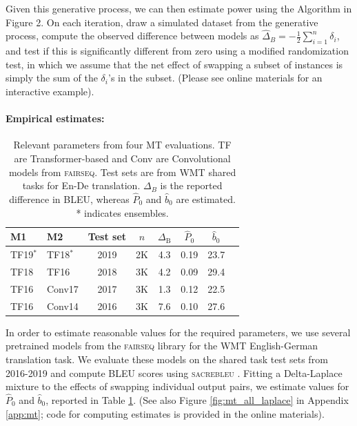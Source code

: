 \documentclass[11pt,a4paper]{article}
\begin{document}
Given this generative process, we can then estimate power using the Algorithm in Figure 2. On each iteration, draw a simulated dataset from the generative process, compute the observed difference between models as $\hat \Delta_B = -\frac{1}{2} \sum_{i=1}^n \delta_i$, and test if this is significantly different from zero using a modified randomization test, in which we assume that the net effect of swapping a subset of instances is simply the sum of the $\delta_i$'s in the subset. (Please see online materials for an interactive example). 

\paragraph{Empirical estimates:}

\begin{table}[]
    \centering
    \small
    \begin{tabular}{l l c c c c c c}
        \toprule
        \textbf{M1} & \textbf{M2} & \textbf{Test set} & $n$ & $\Delta_{\textrm{B}}$ & $\hat P_0$ & $\hat b_0$ \\
        \midrule
        TF19$^*$ & TF18$^*$ & 2019 & 2K & 4.3 & 0.19 & 23.7 \\
        TF18 & TF16 & 2018 & 3K & 4.2 & 0.09 & 29.4 \\
        TF16 & Conv17 & 2017 & 3K & 1.3 & 0.12 & 22.5 \\
        TF16 & Conv14 & 2016 & 3K & 7.6 & 0.10 & 27.6\\
        \bottomrule
    \end{tabular}
    \caption{Relevant parameters from four MT evaluations. TF are Transformer-based 
    \citep{ott.2018,edunov.2018,ng.2019} and Conv are Convolutional models
    \citep{gehring2017convolutional} from \textsc{fairseq}. Test sets are from WMT shared tasks for En-De translation. $\Delta_B$ is the reported difference in BLEU, whereas $\hat P_0$ and $\hat b_0$ are estimated.  * indicates ensembles.}
    \label{tab:mt_params}
\end{table}

In order to estimate reasonable values for the required parameters, we use several pretrained models from the \textsc{fairseq} library \citep{ott.2019} for the WMT English-German translation task.
We evaluate these models on the shared task test sets from 2016-2019 and compute BLEU scores using \textsc{sacrebleu} \citep{post.2018}. 
Fitting a Delta-Laplace mixture to the effects of swapping individual output pairs, we estimate values for $\hat P_0$ and $\hat b_0$, reported in Table \ref{tab:mt_params}. (See also Figure \ref{fig:mt_all_laplace} in Appendix \ref{app:mt}; code for computing estimates is provided in the online materials).
\end{document}
